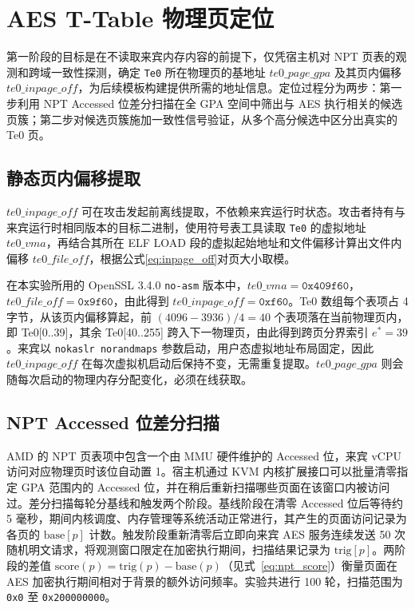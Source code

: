 \section{AES T-Table 物理页定位}
\label{sec:exp_phase1}

第一阶段的目标是在不读取来宾内存内容的前提下，仅凭宿主机对 NPT 页表的观测和跨域一致性探测，确定 \texttt{Te0} 所在物理页的基地址 $\mathit{te0\_page\_gpa}$ 及其页内偏移 $\mathit{te0\_inpage\_off}$，为后续模板构建提供所需的地址信息。定位过程分为两步：第一步利用 NPT Accessed 位差分扫描在全 GPA 空间中筛出与 AES 执行相关的候选页簇；第二步对候选页簇施加一致性信号验证，从多个高分候选中区分出真实的 Te0 页。

\subsection{静态页内偏移提取}

$\mathit{te0\_inpage\_off}$ 可在攻击发起前离线提取，不依赖来宾运行时状态。攻击者持有与来宾运行时相同版本的目标二进制，使用符号表工具读取 \texttt{Te0} 的虚拟地址 $\mathit{te0\_vma}$，再结合其所在 ELF LOAD 段的虚拟起始地址和文件偏移计算出文件内偏移 $\mathit{te0\_file\_off}$，根据公式\eqref{eq:inpage_off}对页大小取模。

在本实验所用的 OpenSSL 3.4.0 \texttt{no-asm} 版本中，$\mathit{te0\_vma} = \texttt{0x409f60}$，$\mathit{te0\_file\_off} = \texttt{0x9f60}$，由此得到 $\mathit{te0\_inpage\_off} = \texttt{0xf60}$。Te0 数组每个表项占 4 字节，从该页内偏移算起，前 $(4096 - 3936) / 4 = 40$ 个表项落在当前物理页内，即 Te0[0..39]，其余 Te0[40..255] 跨入下一物理页，由此得到跨页分界索引 $e^* = 39$。来宾以 \texttt{nokaslr norandmaps} 参数启动，用户态虚拟地址布局固定，因此 $\mathit{te0\_inpage\_off}$ 在每次虚拟机启动后保持不变，无需重复提取。$\mathit{te0\_page\_gpa}$ 则会随每次启动的物理内存分配变化，必须在线获取。

\subsection{NPT Accessed 位差分扫描}

AMD 的 NPT 页表项中包含一个由 MMU 硬件维护的 Accessed 位，来宾 vCPU 访问对应物理页时该位自动置 1。宿主机通过 KVM 内核扩展接口可以批量清零指定 GPA 范围内的 Accessed 位，并在稍后重新扫描哪些页面在该窗口内被访问过。差分扫描每轮分基线和触发两个阶段。基线阶段在清零 Accessed 位后等待约 5 毫秒，期间内核调度、内存管理等系统活动正常进行，其产生的页面访问记录为各页的 $\mathrm{base}[p]$ 计数。触发阶段重新清零后立即向来宾 AES 服务连续发送 50 次随机明文请求，将观测窗口限定在加密执行期间，扫描结果记录为 $\mathrm{trig}[p]$。两阶段的差值 $\mathrm{score}(p) = \mathrm{trig}(p) - \mathrm{base}(p)$（见式~\eqref{eq:npt_score}）衡量页面在 AES 加密执行期间相对于背景的额外访问频率。实验共进行 100 轮，扫描范围为 \texttt{0x0} 至 \texttt{0x200000000}。


